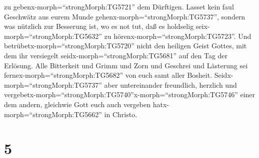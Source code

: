 zu gebenx-morph=``strongMorph:TG5721'' dem Dürftigen. 
Lasset kein faul Geschwätz aus eurem Munde
gehenx-morph=``strongMorph:TG5737'', sondern was nützlich zur Besserung
ist, wo es not tut, daß es holdselig seix-morph=``strongMorph:TG5632''
zu hörenx-morph=``strongMorph:TG5723''.  Und
betrübetx-morph=``strongMorph:TG5720'' nicht den heiligen Geist Gottes,
mit dem ihr versiegelt seidx-morph=``strongMorph:TG5681'' auf den Tag
der Erlösung.  Alle Bitterkeit und Grimm und Zorn und
Geschrei und Lästerung sei fernex-morph=``strongMorph:TG5682'' von euch
samt aller Bosheit.  Seidx-morph=``strongMorph:TG5737''
aber untereinander freundlich, herzlich und
vergebetx-morph=``strongMorph:TG5740''\textbar x-morph=``strongMorph:TG5746''
einer dem andern, gleichwie Gott euch auch vergeben
hatx-morph=``strongMorph:TG5662'' in Christo.

\hypertarget{section-4}{%
\section{5}\label{section-4}}

